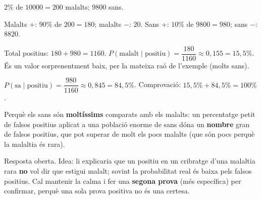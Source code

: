 \begin{solucions}
\begin{sollist}
  \item $2\%$ de $\num{10000}=200$ malalts; $\num{9800}$ sans.
  \item Malalts +: $90\%$ de $200=180$; malalts $-$: $20$. Sans +: $10\%$ de
        $\num{9800}=980$; sans $-$: $\num{8820}$.
  \item Total positius: $180+980=\num{1160}$.
        $P(\text{malalt}\mid\text{positiu})=\dfrac{180}{\num{1160}}\approx 0,155=15,5\%$.
        És un valor sorprenentment baix, per la mateixa raó de l'exemple (molts sans).
  \item $P(\text{sa}\mid\text{positiu})=\dfrac{980}{\num{1160}}\approx 0,845=84,5\%$.
        Comprovació: $15,5\%+84,5\%=100\%$.
  \item Perquè els sans són \textbf{moltíssims} comparats amb els malalts: un percentatge
        petit de falsos positius aplicat a una població enorme de sans dóna un
        \textbf{nombre} gran de falsos positius, que pot superar de molt els pocs
        malalts (que són pocs perquè la malaltia és rara).
  \item Resposta oberta. Idea: li explicaria que un positiu en un cribratge d'una
        malaltia rara \textbf{no} vol dir que estigui malalt; sovint la probabilitat
        real és baixa pels falsos positius. Cal mantenir la calma i fer una \textbf{segona
        prova} (més específica) per confirmar, perquè una sola prova positiva no és una
        certesa.
\end{sollist}
\end{solucions}
